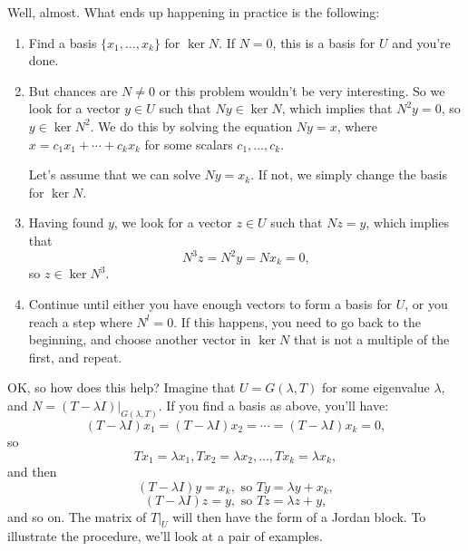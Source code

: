 \documentclass[12pt,letterpaper]{article}
\theoremstyle{definition}
\begin{document}
Well, almost. What ends up happening in practice is the following:
\begin{enumerate}
 \item Find a basis $\{x_1,\ldots, x_k\}$ for $\ker N$. If $N=0$, this is a basis for $U$ and you're done.
 \item But chances are $N\neq 0$ or this problem wouldn't be very interesting. So we look for a vector $y\in U$ such that $Ny\in \ker N$, which implies that $N^2y=0$, so $y\in \ker N^2$. We do this by solving the equation $Ny=x$, where $x=c_1x_1+\cdots +c_kx_k$ for some scalars $c_1,\ldots, c_k$.

 Let's assume that we can solve $Ny=x_k$. If not, we simply change the basis for $\ker N$.
 \item Having found $y$, we look for a vector $z\in U$ such that $Nz=y$, which implies that
\[
 N^3z = N^2y = Nx_k = 0,
\]
so $z\in \ker N^3$.
 \item Continue until either you have enough vectors to form a basis for $U$, or you reach a step where $N^l=0$. If this happens, you need to go back to the beginning, and choose another vector in $\ker N$ that is not a multiple of the first, and repeat.
\end{enumerate}
OK, so how does this help? Imagine that $U=G(\lambda ,T)$ for some eigenvalue $\lambda$, and $N = (T-\lambda I)|_{G(\lambda,T)}$. If you find a basis as above, you'll have:
\[
 (T-\lambda I)x_1 = (T-\lambda I)x_2=\cdots = (T-\lambda I)x_k = 0,
\]
so 
\[
 Tx_1=\lambda x_1, Tx_2=\lambda x_2, \ldots, Tx_k=\lambda x_k,
\]
and then
\[
 (T-\lambda I)y = x_k, \text{ so } Ty = \lambda y + x_k,
\]
\[
 (T-\lambda I)z = y, \text{ so } Tz = \lambda z+y,
\]
and so on. The matrix of $T|_U$ will then have the form of a Jordan block. To illustrate the procedure, we'll look at a pair of examples.
\end{document}
